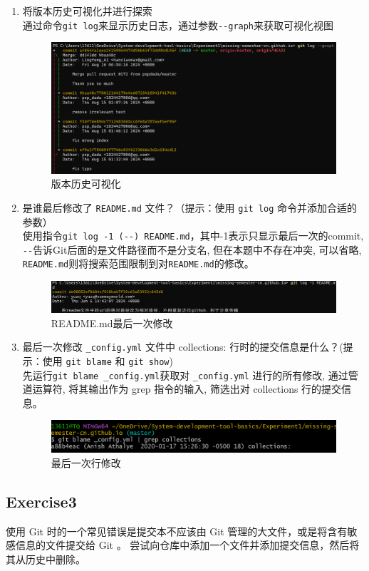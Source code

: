\documentclass{article}
\begin{document}
            \begin{enumerate} 
                \item 将版本历史可视化并进行探索\\
                通过命令\verb|git log|来显示历史日志，通过参数\verb|--graph|来获取可视化视图
                \begin{figure}[H]
                    \centering
                    \includegraphics[scale=0.4]{1.png}
                    \caption{版本历史可视化}
                \end{figure}
                \item 是谁最后修改了 \verb|README.md| 文件？（提示：使用 \verb|git log| 命令并添加合适的参数）\\
                使用指令\verb|git log -1 (--) README.md|，其中-1表示只显示最后一次的commit, 
                \verb|--|告诉Git后面的是文件路径而不是分支名, 但在本题中不存在冲突, 可以省略, 
                \verb|README.md|则将搜索范围限制到对\verb|README.md|的修改。
                \begin{figure}[H]
                    \centering
                    \includegraphics[scale=0.35]{2.png}
                    \caption{README.md最后一次修改}
                \end{figure}
                \item 最后一次修改 \verb|_config.yml| 文件中 collections: 行时的提交信息是什么？(提示：使用 \verb|git blame| 和 \verb|git show|)\\
                先运行\verb |git blame _config.yml|获取对 \verb|_config.yml| 进行的所有修改, 
                通过管道运算符, 将其输出作为 grep 指令的输入, 筛选出对 collections 行的提交信息。
                \begin{figure}[H]
                    \centering
                    \includegraphics[scale=0.7]{3.png}
                    \caption{最后一次行修改}
                \end{figure}
            \end{enumerate}
        \subsection{Exercise3}
        使用 Git 时的一个常见错误是提交本不应该由 Git 管理的大文件，或是将含有敏感信息的文件提交给 Git 。
        尝试向仓库中添加一个文件并添加提交信息，然后将其从历史中删除。
\end{document}

